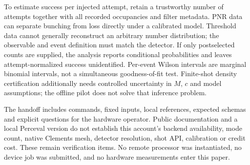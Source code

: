 To estimate success per injected attempt, retain a trustworthy number of attempts together with all recorded occupancies and filter metadata. PNR data can separate bunching from loss directly under a calibrated model. Threshold data cannot generally reconstruct an arbitrary number distribution; the observable and event definition must match the detector. If only postselected counts are supplied, the analysis reports conditional probabilities and leaves attempt-normalized success unidentified. Per-event Wilson intervals are marginal binomial intervals, not a simultaneous goodness-of-fit test. Finite-shot density certification additionally needs controlled uncertainty in $M$, $c$ and model assumptions; the offline pilot does not solve that inference problem.

The handoff includes commands, fixed inputs, local references, expected schemas and explicit questions for the hardware operator. Public documentation and a local Perceval version do not establish this account's backend availability, mode count, native Clements mesh, detector resolution, shot API, calibration or credit cost. These remain verification items. No remote processor was instantiated, no device job was submitted, and no hardware measurements enter this paper.
